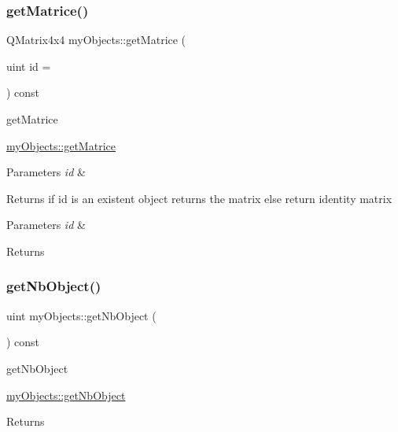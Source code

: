 \subsubsection{\texorpdfstring{get\+Matrice()}{getMatrice()}}
{\footnotesize\ttfamily Q\+Matrix4x4 my\+Objects\+::get\+Matrice (\begin{DoxyParamCaption}\item[{uint}]{id = {} }\end{DoxyParamCaption}) const}



get\+Matrice 

\hyperlink{classmyObjects_a98380353733220fa9d80d149db01732e}{my\+Objects\+::get\+Matrice}


\begin{DoxyParams}{Parameters}
{\em id} & \\
\hline
\end{DoxyParams}
\begin{DoxyReturn}{Returns}
if id is an existent object returns the matrix else return identity matrix
\end{DoxyReturn}

\begin{DoxyParams}{Parameters}
{\em id} & \\
\hline
\end{DoxyParams}
\begin{DoxyReturn}{Returns}

\end{DoxyReturn}
\mbox{\label{classmyObjects_a76824e5ca54bebb188d12ad5ba96678d}} 
\subsubsection{\texorpdfstring{get\+Nb\+Object()}{getNbObject()}}
{\footnotesize\ttfamily uint my\+Objects\+::get\+Nb\+Object (\begin{DoxyParamCaption}{ }\end{DoxyParamCaption}) const\hspace{0.3cm}{\ttfamily [virtual]}}



get\+Nb\+Object 

\hyperlink{classmyObjects_a76824e5ca54bebb188d12ad5ba96678d}{my\+Objects\+::get\+Nb\+Object}

\begin{DoxyReturn}{Returns}

\end{DoxyReturn}
\mbox{\label{classmyObjects_ad5181c0f75a5cbadbff0022402ae448d}} 
